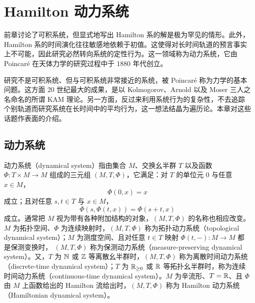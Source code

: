 
\chapter{Hamilton 动力系统}

前章讨论了可积系统，但显式地写出 Hamilton 系的解是极为罕见的情形。此外，Hamilton 系的时间演化往往敏感地依赖于初值。这使得对长时间轨道的预言事实上不可能，因此研究必然转向系统的定性行为。这一领域称为动力系统，它由 Poincaré 在天体力学的研究过程中于 1880 年代创立。

研究不是可积系统、但与可积系统非常接近的系统，被 Poincaré 称为力学的基本问题。这方面 20 世纪最大的成果，是以 Kolmogorov、Arnold 以及 Moser 三人之名命名的所谓 KAM 理论。另一方面，反过来利用系统行为的复杂性，不去追踪个别轨道而研究系统在长时间中的平均行为，这一想法结晶为遍历论。本章对这些话题作表面的介绍。

\section{动力系统}

动力系统（dynamical system）指由集合 $M$、交换幺半群 $T$ 以及函数 $\Phi\colon T\times M\to M$ 组成的三元组 $(M,T,\Phi)$，它满足：对 $T$ 的单位元 $0$ 与任意 $x\in M$，
\begin{equation}
  \Phi(0,x)=x
  \tag{7.1.1}
\end{equation}
成立；且对任意 $s,t\in T$ 与 $x\in M$，
\begin{equation}
  \Phi(s,\Phi(t,x))=\Phi(s+t,x)
  \tag{7.1.2}
\end{equation}
成立。通常把 $M$ 视为带有各种附加结构的对象，$(M,T,\Phi)$ 的名称也相应改变。$M$ 为拓扑空间、$\Phi$ 为连续映射时，$(M,T,\Phi)$ 称为拓扑动力系统（topological dynamical system）；$M$ 为测度空间、且对任意 $t\in T$ 映射 $\Phi(t,-)\colon M\to M$ 都是保测变换时，
$(M,T,\Phi)$ 称为保测动力系统（measure-preserving dynamical system）。又，$T$ 为 $\mathbb{N}$ 或 $\mathbb{Z}$ 等离散幺半群时，$(M,T,\Phi)$ 称为离散时间动力系统（discrete-time dynamical system）；$T$ 为 $\mathbb{R}_{\ge0}$ 或 $\mathbb{R}$ 等拓扑幺半群时，称为连续时间动力系统（continuous-time dynamical system）。$M$ 为辛流形、$T=\mathbb{R}$、且 $\Phi$ 由 $M$ 上函数给出的 Hamilton 流给出时，$(M,T,\Phi)$ 称为 Hamilton 动力系统（Hamiltonian dynamical system）。


